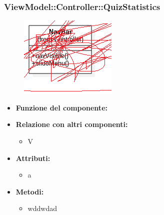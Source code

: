 \subsubsection{ViewModel::Controller::QuizStatistics}
 \begin{figure}[h!]
\begin{center}
	\includegraphics[scale=0.4]{../images/ViewModel/Controller/QuizStatistics.png}
\end{center}
\end{figure}
  \begin{itemize}
 \item\textbf{Funzione del componente:} 
 \item\textbf{Relazione con altri componenti:}
 \begin{itemize}
		\item V
 \end{itemize}
 \item\textbf{Attributi:}
 \begin{itemize}
\item a
 \end{itemize}
 \item\textbf{Metodi:}
 	\begin{itemize}
\item wddwdad
 	\end{itemize}
 \end{itemize}
\newpage

